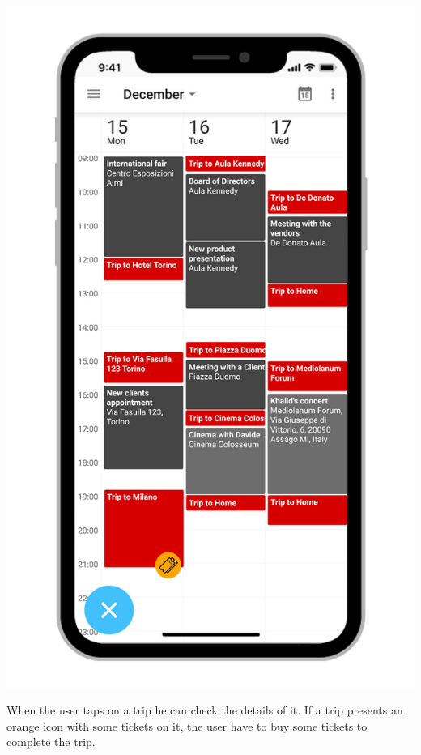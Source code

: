 \begin{center}
\includegraphics[scale=1.2]{MainMatter/images/ui/tripsscreen}
\end{center}
When the user taps on a trip he can check the details of it. If a trip presents an orange icon with some tickets on it, the user have to buy some tickets to complete the trip.
